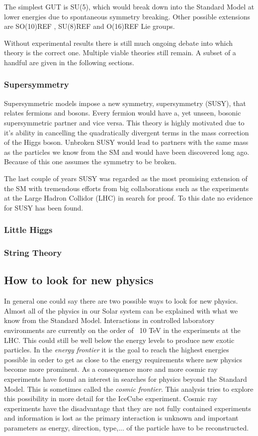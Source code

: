 The simplest GUT is SU(5), which would break down into the Standard Model at lower energies due to spontaneous symmetry breaking. Other possible extensions are SO(10)REF , SU(8)REF and O(16)REF Lie groups.

Without experimental results there is still much ongoing debate into which theory is the correct one. Multiple viable theories still remain. A subset of a handful are given in the following sections.

\subsubsection*{Supersymmetry}
Supersymmetric models impose a new symmetry, supersymmetry (SUSY), that relates fermions and bosons. Every fermion would have a, yet unseen, bosonic supersymmetric partner and vice versa. This theory is highly motivated due to it's ability in cancelling the quadratically divergent terms in the mass correction of the Higgs boson. Unbroken SUSY would lead to partners with the same mass as the particles we know from the SM and would have been discovered long ago. Because of this one assumes the symmetry to be broken.

The last couple of years SUSY was regarded as the most promising extension of the SM with tremendous efforts from big collaborations such as the experiments at the Large Hadron Collidor (LHC) in search for proof. To this date no evidence for SUSY has been found.

\subsubsection*{Little Higgs}

\subsubsection*{String Theory}




\subsection{How to look for new physics}
In general one could say there are two possible ways to look for new physics. Almost all of the physics in our Solar system can be explained with what we know from the Standard Model. Interactions in controlled laboratory environments are currently on the order of ~10 TeV in the experiments at the LHC. This could still be well below the energy levels to produce new exotic particles. In the \textit{energy frontier} it is the goal to reach the highest energies possible in order to get as close to the energy requirements where new physics become more prominent. As a consequence more and more cosmic ray experiments have found an interest in searches for physics beyond the Standard Model. This is sometimes called the \textit{cosmic frontier}. This analysis tries to explore this possibility in more detail for the IceCube experiment. Cosmic ray experiments have the disadvantage that they are not fully contained experiments and information is lost as the primary interaction is unknown and important parameters as energy, direction, type,... of the particle have to be reconstructed.

